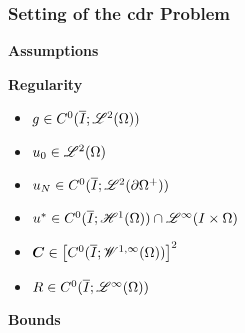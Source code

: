\begin{frame}
    \frametitle{Setting of the \acrshort{cdr} Problem}

    \vspace*{\fill}
    \begin{center}
        {\color{\accentcolor} \Large \textbf{Assumptions}}
    \end{center}

    \begin{multicols}{2}

        \begin{center}
            {\color{\accentcolor} \Large \textbf{Regularity}}
            \vspace*{0.5cm}
            
            \begin{minipage}{0.4\textwidth}
                \begin{itemize}
                    \item $g \in C^0(\overline{I}; \mathscr{L}^{2}(\Omega))$
                    \item $u_0 \in \mathscr{L}^{2}(\Omega)$
                    \item $u_N \in C^0(\overline{I}; \mathscr{L}^{2}(\partial \Omega^+))$
                    \item { \color{\accentcolor} $u^* \in C^0(\overline{I}; \mathscr{H}^{1}(\Omega)) \cap \mathscr{L}^{\infty}(I \times \Omega)$}
                    \item $\bm{C} \in \left[ C^0(\overline{I}; \mathscr{W}^{1, \infty}(\Omega)) \right]^2$
                    \item $R \in C^0(\overline{I}; \mathscr{L}^{\infty}(\Omega))$
                \end{itemize}
            \end{minipage}
        \end{center}

        \vfill\null
        \columnbreak

        \begin{center}
            {\color{\accentcolor} \Large \textbf{Bounds}}
            \vspace*{0.5cm}
            

\end{center}
\end{multicols}
\end{frame}
